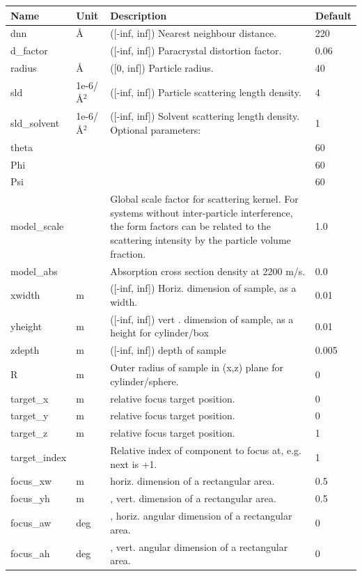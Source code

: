 \begin{longtable}{p{}p{}p{}p{}}
\toprule
\textbf{Name} & \textbf{Unit} & \textbf{Description} & \textbf{Default} \\
\midrule
\endhead
dnn & \AA{} & ([-inf, inf]) Nearest neighbour distance. & 220 \\
d\_factor &  & ([-inf, inf]) Paracrystal distortion factor. & 0.06 \\
radius & \AA{} & ([0, inf]) Particle radius. & 40 \\
sld & 1e-6/\AA{}$^{2}$ & ([-inf, inf]) Particle scattering length density. & 4 \\
sld\_solvent & 1e-6/\AA{}$^{2}$ & ([-inf, inf]) Solvent scattering length density. Optional parameters: & 1 \\
theta &  &  & 60 \\
Phi &  &  & 60 \\
Psi &  &  & 60 \\
model\_scale &   & Global scale factor for scattering kernel. For systems without inter-particle interference, the form factors can be related to the scattering intensity by the particle volume fraction. & 1.0 \\
model\_abs &   & Absorption cross section density at 2200 m/s. & 0.0 \\
xwidth & m & ([-inf, inf]) Horiz. dimension of sample, as a width. & 0.01 \\
yheight & m & ([-inf, inf]) vert . dimension of sample, as a height for cylinder/box & 0.01 \\
zdepth & m & ([-inf, inf]) depth of sample & 0.005 \\
R & m & Outer radius of sample in (x,z) plane for cylinder/sphere. & 0 \\
target\_x & m & relative focus target position. & 0 \\
target\_y & m & relative focus target position. & 0 \\
target\_z & m & relative focus target position. & 1 \\
target\_index &   & Relative index of component to focus at, e.g. next is +1. & 1 \\
focus\_xw & m & horiz. dimension of a rectangular area. & 0.5 \\
focus\_yh & m & , vert. dimension of a rectangular area. & 0.5 \\
focus\_aw & deg & , horiz. angular dimension of a rectangular area. & 0 \\
focus\_ah & deg & , vert. angular dimension of a rectangular area. & 0 \\

\end{longtable}
